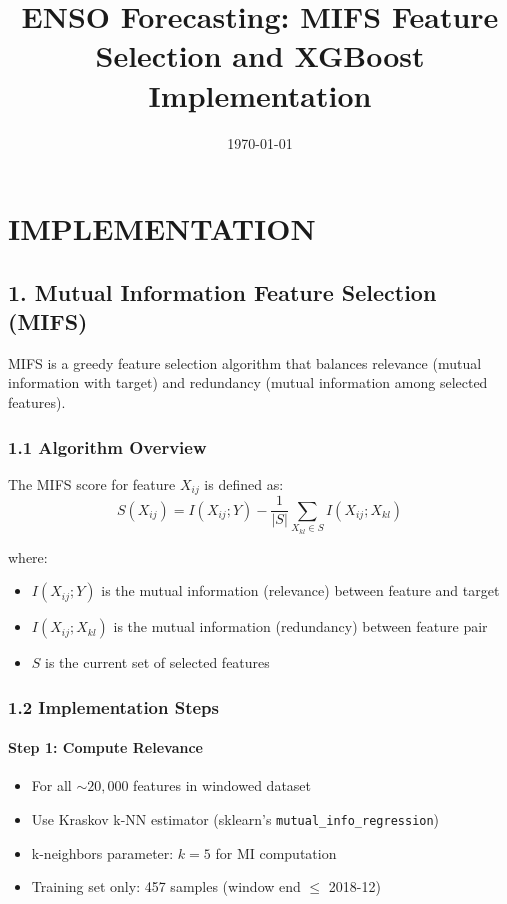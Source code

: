 \documentclass[12pt,a4paper]{article}
\title{ENSO Forecasting: MIFS Feature Selection and XGBoost Implementation}
\author{}
\date{\today}
\begin{document}
\maketitle

\section*{IMPLEMENTATION}

\subsection*{1. Mutual Information Feature Selection (MIFS)}

MIFS is a greedy feature selection algorithm that balances relevance (mutual information with target) and redundancy (mutual information among selected features).

\subsubsection*{1.1 Algorithm Overview}

The MIFS score for feature $X_{ij}$ is defined as:
\begin{equation}
S(X_{ij}) = I(X_{ij}; Y) - \frac{1}{|S|} \sum_{X_{kl} \in S} I(X_{ij}; X_{kl})
\end{equation}

where:
\begin{itemize}
    \item $I(X_{ij}; Y)$ is the mutual information (relevance) between feature and target
    \item $I(X_{ij}; X_{kl})$ is the mutual information (redundancy) between feature pair
    \item $S$ is the current set of selected features
\end{itemize}

\subsubsection*{1.2 Implementation Steps}

\paragraph{Step 1: Compute Relevance}
\begin{itemize}
    \item For all $\sim 20,000$ features in windowed dataset
    \item Use Kraskov k-NN estimator (sklearn's \texttt{mutual\_info\_regression})
    \item k-neighbors parameter: $k=5$ for MI computation
    \item Training set only: 457 samples (window end $\leq$ 2018-12)
\end{itemize}
\end{document}

